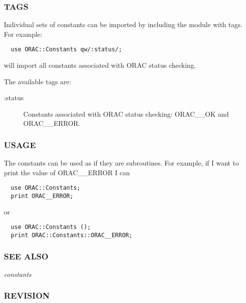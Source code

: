 \subsubsection*{TAGS\label{ORAC::Constants_TAGS}}


Individual sets of constants can be imported by 
including the module with tags. For example:

\begin{verbatim}
  use ORAC::Constants qw/:status/;
\end{verbatim}


will import all constants associated with ORAC status checking.



The available tags are:

\begin{description}

\item[{:status}] \mbox{}

Constants associated with ORAC status checking: ORAC\_\_OK and ORAC\_\_ERROR.

\end{description}
\subsubsection*{USAGE\label{ORAC::Constants_USAGE}}


The constants can be used as if they are subroutines.
For example, if I want to print the value of ORAC\_\_ERROR I can

\begin{verbatim}
  use ORAC::Constants;
  print ORAC__ERROR;
\end{verbatim}


or

\begin{verbatim}
  use ORAC::Constants ();
  print ORAC::Constants::ORAC__ERROR;
\end{verbatim}
\subsubsection*{SEE ALSO\label{ORAC::Constants_SEE_ALSO}}


\emph{constants}

\subsubsection*{REVISION\label{ORAC::Constants_REVISION}}


